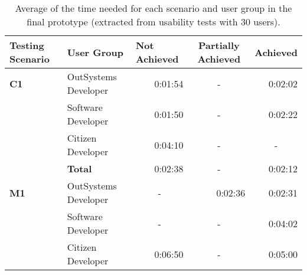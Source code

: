 \begin{table}[tb]
  \caption{Average of the time needed for each scenario and user group in the final prototype (extracted from usability tests with 30 users).}
    \label{tab:duration_final_prototype}
  \begin{tabular}{llrcr}
  \hline
  \rowcolor[HTML]{EFEFEF} 
  \textbf{Testing Scenario} & \textbf{User Group}  & \multicolumn{1}{l}{\cellcolor[HTML]{EFEFEF}\textbf{Not Achieved}} & \multicolumn{1}{C{2cm}}{\cellcolor[HTML]{EFEFEF}\textbf{Partially Achieved}} & \multicolumn{1}{l}{\cellcolor[HTML]{EFEFEF}\textbf{Achieved}} \\ \hline
  \textbf{C1}               & OutSystems Developer & 0:01:54                                                           & -                                                                       & 0:02:02                                                       \\
                            & Software Developer   & 0:01:50                                                           & -                                                                       & 0:02:22                                                       \\
                            & Citizen Developer    & 0:04:10                                                           & -                                                                       & \multicolumn{1}{c}{-}                                         \\
                            & \textbf{Total}       & 0:02:38                                                           & -                                                                       & 0:02:12                                                       \\ \hline
  \textbf{M1}               & OutSystems Developer & \multicolumn{1}{c}{-}                                             & \multicolumn{1}{r}{0:02:36}                                             & 0:02:31                                                       \\
                            & Software Developer   & \multicolumn{1}{c}{-}                                             & -                                                                       & 0:04:02                                                       \\
                            & Citizen Developer    & 0:06:50                                                           & -                                                                       & 0:05:00                                                       \\

\end{tabular}
\end{table}
